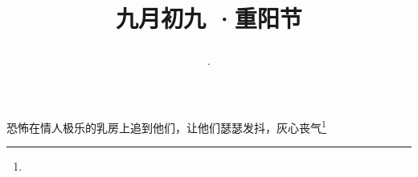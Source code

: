 \title{\date[d=11,m=10,y=2024][year:cn-y,年,month:cn,day:cn,日,·,weekday]·九月初九 ·重阳节}
恐怖在情人极乐的乳房上追到他们，让他们瑟瑟发抖，灰心丧气\footnote{ }

